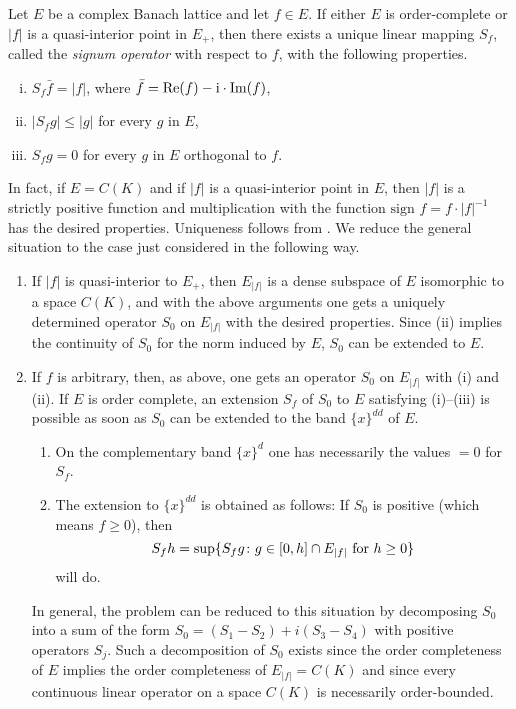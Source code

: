 Let $ E $ be a complex Banach lattice and let $ f \in E $.
If either $ E $ is order-complete or $ |f| $ is a quasi-interior point in $ E_{+} $, then there exists a unique linear mapping $ S_{f} $, called the \emph{signum operator} with respect to $ f $, with the following properties.
\begin{enumerate}[(i)]

\item 
$ S_{f}\bar{f} = |f| $, where $ \bar{f} = \mathop{}\!\mathrm{Re}(f) -  \mathrm{i} \cdot\mathop{}\!\mathrm{Im}(f) $,

\item 
$ |S_{f}g| \leq |g| $ for every $ g $ in $ E $,

\item 
$ S_{f}g = 0 $ for every $ g $ in $ E $ orthogonal to $ f $.
\end{enumerate}
In fact, if $ E = C(K) $ and if $ |f| $ is a quasi-interior point in $ E $, then $ |f| $ is a strictly positive function and multiplication with the function $ \text{sign } f = f\cdot|f|^{-1} $ has the desired properties.
Uniqueness follows from \citet[Chap. 20]{zaanen:1983}. %
We reduce the general situation to the case just considered in the following way.
\begin{enumerate}[---]

\item 
If $ |f| $ is quasi-interior to $ E_{+} $, then $ E_{|f|} $ is a dense subspace of $ E $ isomorphic to a space $ C(K) $, and with the above arguments one gets a uniquely determined operator $ S_{0} $ on $ E_{|f|} $ with the desired properties.
Since (ii) implies the continuity of $ S_{0} $ for the norm induced by $ E $, $ S_{0} $ can be extended to $ E $.

\item 
If $ f $ is arbitrary, then, as above, one gets an operator $ S_{0} $ on $ E_{|f|} $ with (i) and (ii).
If $ E $ is order complete, an extension $ S_{f} $ of $ S_{0} $ to $ E $ satisfying (i)--(iii) is possible as soon as $ S_{0} $ can be extended to the band $ \{x\}^{dd} $ of $ E $.

\begin{enumerate}[-]
\item
On the complementary band $ \{x\}^{d} $ one has necessarily the values $ = 0 $ for $ S_{f} $.

\item
The extension to $ \{x\}^{dd} $ is obtained as follows:
If $ S_{0} $ is positive (which means $ f \geq 0 $), then
\[
S_{f}h = \sup \{ S_{f}g \colon g \in [0,h] \cap E_{|f|} \text{ for $ h \geq 0 $} \}
\]
will do.
\end{enumerate}
In general, the problem can be reduced to this situation by decomposing $ S_{0} $ into a sum of the form $ S_{0} = (S_{1} - S_{2}) + i(S_{3} - S_{4}) $ with positive operators $ S_{j} $.
Such a decomposition of $ S_{0} $ exists since the order completeness of $ E $ implies the order completeness of $ E_{|f|} = C(K) $ and since every continuous linear operator on a space $ C(K) $ is necessarily order-bounded.

\end{enumerate}
